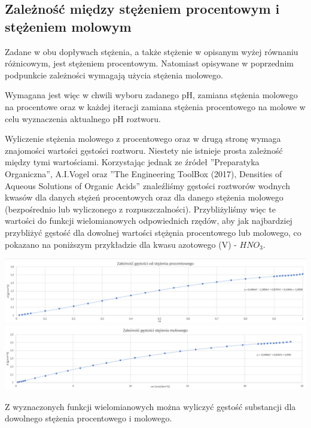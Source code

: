 \documentclass[polish,polish,a4paper,12pt]{article}
\begin{document}
	\subsection{Zależność między stężeniem procentowym i stężeniem molowym}
	
	Zadane w obu dopływach stężenia, a także stężenie w opisanym wyżej równaniu różnicowym, jest stężeniem procentowym. Natomiast opisywane w poprzednim podpunkcie zależności wymagają użycia stężenia molowego.
	
	Wymagana jest więc w chwili wyboru zadanego pH, zamiana stężenia molowego na procentowe oraz w każdej iteracji zamiana stężenia procentowego na molowe w celu wyznaczenia aktualnego pH roztworu.

	Wyliczenie stężenia molowego z procentowego oraz w drugą stronę wymaga znajomości wartości gęstości roztworu. Niestety nie istnieje prosta zależność między tymi wartościami. Korzystając jednak ze źródeł ''Preparatyka Organiczna'', A.I.Vogel oraz ''The Engineering \mbox{ToolBox} (2017), Densities of Aqueous Solutions of Organic Acids'' znaleźliśmy gęstości roztworów wodnych kwasów dla danych stężeń procentowych oraz dla danego stężenia molowego (bezpośrednio lub wyliczonego z rozpuszczalności). Przybliżyliśmy więc te wartości do funkcji wielomianowych odpowiednich rzędów, aby jak najbardziej przybliżyć gęstość dla dowolnej wartości stężęnia procentowego lub molowego, co pokazano na poniższym przykładzie dla kwasu azotowego (V) - $HNO_3$.
	
	\begin{center}
		\includegraphics[scale=0.45]{1}\\
		\includegraphics[scale=0.45]{2}\\
	\end{center}
	
	Z wyznaczonych funkcji wielomianowych można wyliczyć gęstość substancji dla dowolnego stężenia procentowego i molowego.
	
\end{document}
